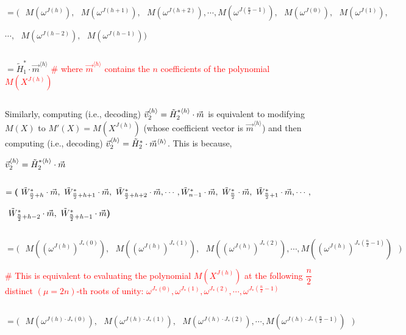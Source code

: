 $ $

$= \bm{(} \text{ } M(\omega^{J(h)}), \text{ } M(\omega^{J(h+1)}), \text{ } M(\omega^{J(h+2)}), \cdots, M(\omega^{J(\frac{n}{2}-1)}), \text{ } M(\omega^{J(0)}), \text{ }M(\omega^{J(1)}),$ 
                                    
$\cdots, \text{ } M(\omega^{J(h-2)}), \text{ } M(\omega^{J(h-1)})  \bm{)}$ 

$ $

$= \tilde{H}_1^{*}\cdot \vec{m}^{\langle h \rangle}$ \textcolor{red}{ \text{ } \# where $\vec{m}^{\langle h \rangle}$ contains the $n$ coefficients of the polynomial $M(X^{J(h)})$ }


$ $

Similarly, computing (i.e., decoding) $\vec{v}_2^{\langle h \rangle} = \tilde{H}_2^{*\langle h \rangle}\cdot \vec{m}$ is equivalent to modifying $M(X)$ to $M'(X) = M(X^{J(h)})$ (whose coefficient vector is $\vec{m}^{\langle h \rangle}$) and then computing (i.e., decoding) $\vec{v}_2^{\langle h \rangle} = \tilde{H}_2^{*}\cdot \vec{m}^{\langle h \rangle}$. This is because,

$\vec{v}_2^{\langle h \rangle} =\tilde{H}_2^{*\langle h \rangle}\cdot \vec{m}$

$ $


$ = \bm{(} \text{ } \tilde{W}^*_{\frac{n}{2} +h}\cdot\vec{m}, \text{ } \tilde{W}^*_{\frac{n}{2} + h+1}\cdot\vec{m}, \text{ } \tilde{W}^*_{\frac{n}{2} +h+2}\cdot\vec{m}, \cdots, \tilde{W}^*_{n -1}\cdot\vec{m}, \text{ } \tilde{W}^*_{\frac{n}{2}}\cdot\vec{m}, \text{ }\tilde{W}^*_{\frac{n}{2} + 1}\cdot\vec{m}, \cdots,$

\text{ }\text{ }\text{ }\text{ }$ \text{ } \tilde{W}^*_{\frac{n}{2} + h-2}\cdot\vec{m}, \text{ } \tilde{W}^*_{\frac{n}{2} + h-1}\cdot\vec{m}  \bm{)}$

$ $

$= \bm{(} \text{ } M((\omega^{J(h)})^{J_*(0)}), \text{ } M((\omega^{J(h)})^{J_*(1)}), \text{ } M((\omega^{J(h)})^{J_*(2)}), \cdots, M((\omega^{J(h)})^{J_*(\frac{n}{2}-1)}) \text{ } \bm{)}$


\textcolor{red}{\# This is equivalent to evaluating the polynomial $M(X^{J(h)})$ at the following $\dfrac{n}{2}$ distinct $(\mu=2n)$-th roots of unity: $\omega^{J_*(0)}, \omega^{J_*(1)},  \omega^{J_*(2)}, \cdots, \omega^{J_*(\frac{n}{2} - 1)}$}

$ $

$= \bm{(} \text{ } M(\omega^{J(h)\cdot J_*(0)}), \text{ } M(\omega^{J(h)\cdot J_*(1)}), \text{ } M(\omega^{J(h)\cdot J_*(2)}), \cdots, M(\omega^{J(h)\cdot J_*(\frac{n}{2}-1)}) \text{ } \bm{)}$

